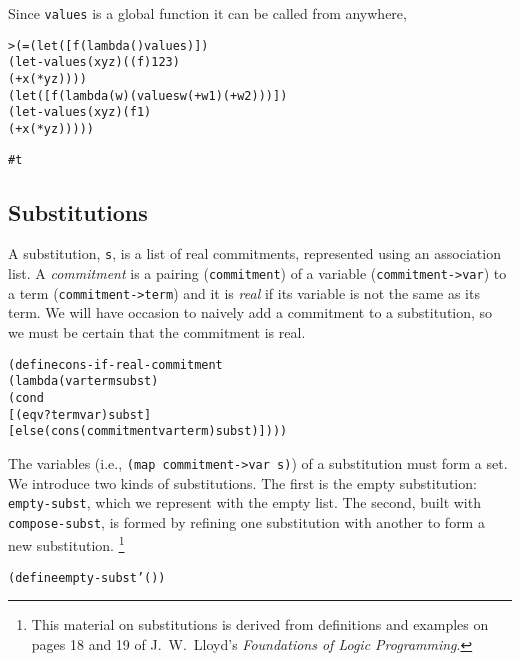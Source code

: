 Since \texttt{values} is a global function it can be called from
anywhere,
\begin{alltt}
> (= (let ([f (lambda () values)])
       (let-values (x y z) ((f) 1 2 3)
         (+ x (* y z))))
     (let ([f (lambda (w) (values w (+ w 1) (+ w 2)))])
       (let-values (x y z) (f 1)
         (+ x (* y z)))))

#t
\end{alltt}

\subsection{Substitutions}

A substitution, \texttt{s}, is a list of real commitments, represented
using an association list. A \emph{commitment} is a pairing
(\texttt{commitment}) of a variable (\texttt{commitment->var}) to a
term (\texttt{commitment->term}) and it is \emph{real} if its variable
is not the same as its term.  We will have occasion to naively add a
commitment to a substitution, so we must be certain that the
commitment is real.

\begin{alltt}
(define cons-if-real-commitment
  (lambda (var term subst)
    (cond
      [(eqv? term var) subst]
      [else (cons (commitment var term) subst)])))
\end{alltt}

\noindent
The variables (i.e., \texttt{(map commitment->var s)}) of a
substitution must form a set.  We introduce two kinds of
substitutions.  The first is the empty substitution:
\texttt{empty-subst}, which we represent with the empty list.  The
second, built with \texttt{compose-subst}, is formed by refining one
substitution with another to form a new substitution.
\footnote{This material on substitutions is derived from
definitions and examples on pages 18 and 19 of J.\ W.\ Lloyd's
\emph{Foundations of Logic Programming}.}

\begin{alltt}
(define empty-subst '())
\end{alltt}

